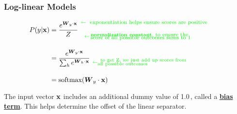 \documentclass[xcolor=pdftex,x11names,table,hyperref]{beamer}
\begin{document}
\begin{frame}[fragile]\frametitle{Log-linear Models}
	\begin{Large}
	\begin{align}
		P(y | \mathbf{x}) & = \frac{{\mathnormal e}^{\boldsymbol W_y \cdot \mathbf{x}} }{Z} \hspace*{0.4em} \substack{\color{green}{ \leftarrow \, \text{\parbox[c]{0.58\textwidth}{ {\footnotesize \, exponentiation helps ensure scores are positive}}}} \\[1.0em]  \color{green}{ \leftarrow \, \text{\parbox[c]{0.55\textwidth}{ \textbf{normalization constant}, {\footnotesize to ensure the \\[-0.9em] score of all possible outcomes sums to 1}}}}}  \nonumber\\[1.0em]
							& =	\frac{{\mathnormal e}^{\boldsymbol W_y \cdot \mathbf{x}}}{\sum_h {\mathnormal e}^{\boldsymbol W_h \cdot \mathbf{x}}}  \,\, \substack{ \, \\[1.0em]  \color{green}{ \leftarrow \text{\parbox[c]{0.50\textwidth}{ \, to get Z, we just add up scores from \\[-0.8em] all possible outcomes}}}} \nonumber\\[1.0em]
							& = \text{softmax}(\boldsymbol W_y \cdot \mathbf{x}) \nonumber%
	\end{align}
	\end{Large}
	\pause

	The input vector $\bf x$ includes an additional dummy value of 1.0\,, called a \href{https://stackoverflow.com/questions/2480650/role-of-bias-in-neural-networks}{\textbf{bias term}}.
	This helps determine the offset of the linear separator.  %
\end{frame}
\end{document}
